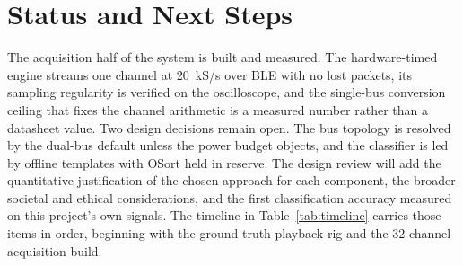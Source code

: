 \documentclass[11pt]{article}
\begin{document}
\section{Status and Next Steps}
The acquisition half of the system is built and measured. The hardware-timed engine streams
one channel at 20~kS/s over BLE with no lost packets, its sampling regularity is verified on
the oscilloscope, and the single-bus conversion ceiling that fixes the channel arithmetic is
a measured number rather than a datasheet value. Two design decisions remain open. The bus
topology is resolved by the dual-bus default unless the power budget objects, and the
classifier is led by offline templates with OSort held in reserve. The design review will
add the quantitative justification of the chosen approach for each component, the broader
societal and ethical considerations, and the first classification accuracy measured on this
project's own signals. The timeline in Table~\ref{tab:timeline} carries those items in order,
beginning with the ground-truth playback rig and the 32-channel acquisition build.
\end{document}
